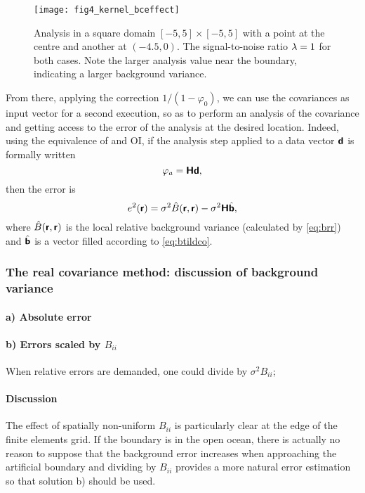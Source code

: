 \begin{figure}[htpb]
\centering
\texttt{[image: fig4\_kernel\_bceffect]}
\caption[Analysis in a square domain with a point at the centre and another at $(-4.5,0)$.]{Analysis in a square domain $[-5,5]\times[-5,5]$ with a point at the centre and another at $(-4.5,0)$. The signal-to-noise ratio $\lambda=1$ for both cases. Note the larger analysis value near the boundary, indicating a larger background variance.
\label{fig:fig4_kernel_bceffect}}
\end{figure} 
 
From there, applying the correction $1/(1-\varphi_0)$, we can use the covariances as input vector for a second \diva execution, so as to perform an analysis of the covariance and getting access to the error of the analysis at the desired location. Indeed, using the equivalence of \diva and OI, if the analysis step applied to a data vector $\mbox{\boldmath $ \protect\mathsf{d} $}$ is formally written 
\begin{equation}
\varphi_a = \mbox{\boldmath $ \protect\mathsf{H} $} \mbox{\boldmath $ \protect\mathsf{d} $},
\end{equation}
then the error is 
\begin{equation}
e^2 (\mbox{\boldmath $ \protect\mathsf{r} $}) = \sigma^2 \hat{B}(\mbox{\boldmath $ \protect\mathsf{r} $},\mbox{\boldmath $ \protect\mathsf{r} $}) - \sigma^2 \mbox{\boldmath $ \protect\mathsf{H} $} \hat{\mbox{\boldmath $ \protect\mathsf{b} $}},
\end{equation}
where $\hat{B}(\mbox{\boldmath $ \protect\mathsf{r} $},\mbox{\boldmath $ \protect\mathsf{r} $})$ is the local relative background variance (calculated by \eqref{eq:brr}) and $\hat{\mbox{\boldmath $ \protect\mathsf{b} $}}$ is a vector filled according to \eqref{eq:btildco}.


\subsubsection{The real covariance method: discussion of background variance\label{sec:backgroundrealcovariance}}


\paragraph{a) Absolute error}


\paragraph{b) Errors scaled by $B_{ii}$}


When relative errors are demanded, one could divide by $\sigma^2 B_{ii}$; 




\paragraph{Discussion}
The effect of spatially non-uniform $B_{ii}$ is particularly clear at the edge of the finite elements grid. If the boundary is in the open ocean, there is actually no reason to suppose that the background error increases when approaching the artificial boundary and dividing by $B_{ii}$ provides a more natural error estimation so that solution b) should be used. 

